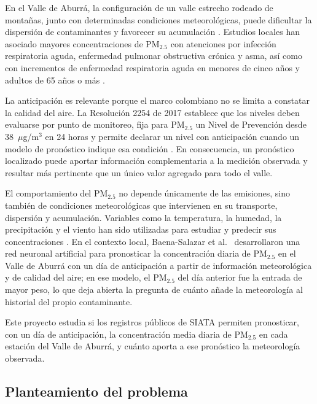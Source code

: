 \documentclass[conference]{IEEEtran}
\begin{document}
En el Valle de Aburrá, la configuración de un valle estrecho rodeado de
montañas, junto con determinadas condiciones meteorológicas, puede dificultar
la dispersión de contaminantes y favorecer su acumulación
\cite{baena2019red}. Estudios locales han asociado mayores concentraciones de
PM$_{2.5}$ con atenciones por infección respiratoria aguda, enfermedad
pulmonar obstructiva crónica y asma, así como con incrementos de enfermedad
respiratoria aguda en menores de cinco años y adultos de 65 años o más
\cite{parra2020analitica,grisales2022relacion}.

La anticipación es relevante porque el marco colombiano no se limita a
constatar la calidad del aire. La Resolución 2254 de 2017 establece que los
niveles deben evaluarse por punto de monitoreo, fija para PM$_{2.5}$ un Nivel
de Prevención desde 38~$\mu$g/m$^3$ en 24 horas y permite declarar un nivel
con anticipación cuando un modelo de pronóstico indique esa condición
\cite{minambiente2017resolucion2254}. En consecuencia, un pronóstico localizado
puede aportar información complementaria a la medición observada y resultar
más pertinente que un único valor agregado para todo el valle.

El comportamiento del PM$_{2.5}$ no depende únicamente de las emisiones, sino
también de condiciones meteorológicas que intervienen en su transporte,
dispersión y acumulación. Variables como la temperatura, la humedad, la
precipitación y el viento han sido utilizadas para estudiar y predecir sus
concentraciones \cite{kleine2017modeling}. En el contexto local,
Baena-Salazar et al.\ \cite{baena2019red} desarrollaron una red neuronal
artificial para pronosticar la concentración diaria de PM$_{2.5}$ en el Valle
de Aburrá con un día de anticipación a partir de información meteorológica y
de calidad del aire; en ese modelo, el PM$_{2.5}$ del día anterior fue
la entrada de mayor peso, lo que deja abierta la pregunta de cuánto añade la
meteorología al historial del propio contaminante.

Este proyecto estudia si los registros públicos de SIATA permiten
pronosticar, con un día de anticipación, la concentración media diaria de
PM$_{2.5}$ en cada estación del Valle de Aburrá, y cuánto aporta a ese
pronóstico la meteorología observada.


\subsection{Planteamiento del problema}
\label{sec:problema}
\end{document}

